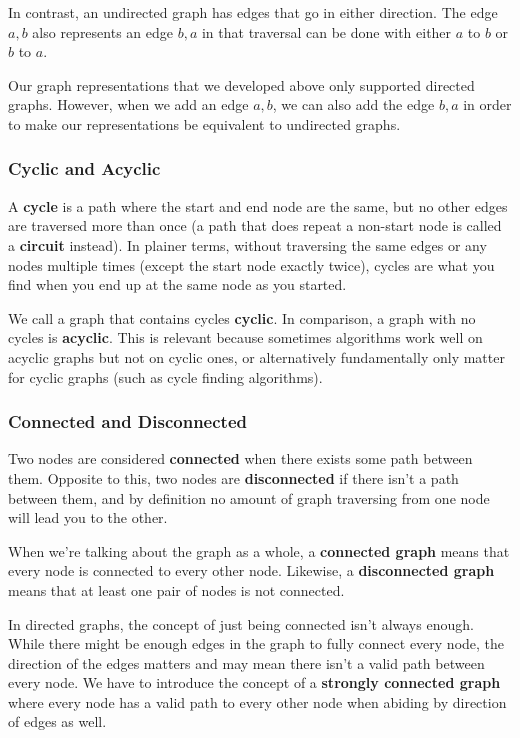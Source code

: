 In contrast, an undirected graph has edges that go in either direction. The edge $a,b$ also represents an edge $b,a$ in that traversal can be done with either $a$ to $b$ or $b$ to $a$.

Our graph representations that we developed above only supported directed graphs. However, when we add an edge $a,b$, we can also add the edge $b,a$ in order to make our representations be equivalent to undirected graphs.

\subsubsection{Cyclic and Acyclic}
   

A \textbf{cycle} is a path where the start and end node are the same, but no other edges are traversed more than once (a path that does repeat a non-start node is called a \textbf{circuit} instead). In plainer terms, without traversing the same edges or any nodes multiple times (except the start node exactly twice), cycles are what you find when you end up at the same node as you started.

We call a graph that contains cycles \textbf{cyclic}. In comparison, a graph with no cycles is \textbf{acyclic}. This is relevant because sometimes algorithms work well on acyclic graphs but not on cyclic ones, or alternatively fundamentally only matter for cyclic graphs (such as cycle finding algorithms).

\subsubsection{Connected and Disconnected}
  

Two nodes are considered \textbf{connected} when there exists some path between them. Opposite to this, two nodes are \textbf{disconnected} if there isn't a path between them, and by definition no amount of graph traversing from one node will lead you to the other.

When we're talking about the graph as a whole, a \textbf{connected graph} means that every node is connected to every other node. Likewise, a \textbf{disconnected graph} means that at least one pair of nodes is not connected.

In directed graphs, the concept of just being connected isn't always enough. While there might be enough edges in the graph to fully connect every node, the direction of the edges matters and may mean there isn't a valid path between every node. We have to introduce the concept of a \textbf{strongly connected graph} where every node has a valid path to every other node when abiding by direction of edges as well.

